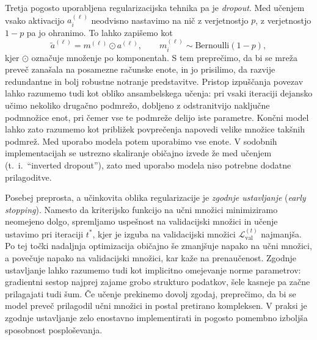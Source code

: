 Tretja pogosto uporabljena regularizacijska tehnika pa je \emph{dropout}.
%
%
Med učenjem vsako aktivacijo $a_i^{(\ell)}$ neodvisno nastavimo na nič z verjetnostjo $p$, z verjetnostjo $1-p$ pa jo ohranimo. To lahko zapišemo kot
\[
\tilde{a}^{(\ell)} = m^{(\ell)} \odot a^{(\ell)}, \qquad m_i^{(\ell)} \sim \text{Bernoulli}(1-p),
\]
kjer $\odot$ označuje množenje po komponentah. S tem preprečimo, da bi se mreža preveč zanašala na posamezne računske enote, in jo prisilimo, da razvije redundantne in bolj robustne notranje predstavitve. Pristop izpuščanja povezav lahko razumemo tudi kot obliko ansambelskega učenja:
%
%
pri vsaki iteraciji dejansko učimo nekoliko drugačno podmrežo, dobljeno z odstranitvijo naključne podmnožice enot, pri čemer vse te podmreže delijo iste parametre. Končni model lahko zato razumemo kot približek povprečenja napovedi velike množice takšnih podmrež. Med uporabo modela potem uporabimo vse enote. V sodobnih implementacijah se ustrezno skaliranje običajno izvede že med učenjem (t.\ i.\ ``inverted dropout''),
%
%
zato med uporabo modela niso potrebne dodatne prilagoditve.

Posebej preprosta, a učinkovita oblika regularizacije je \emph{zgodnje ustavljanje} ({\em early stopping}). Namesto da kriterijsko funkcijo na učni množici minimiziramo neomejeno dolgo, spremljamo uspešnost na validacijski množici in učenje ustavimo pri iteraciji $t^\ast$, kjer je izguba na validacijski množici $\mathcal{L}_{\text{val}}^{(t)}$ najmanjša. Po tej točki nadaljnja optimizacija običajno še zmanjšuje napako na učni množici, a povečuje napako na validacijski množici, kar kaže na prenaučenost. Zgodnje ustavljanje lahko razumemo tudi kot implicitno omejevanje norme parametrov: gradientni sestop najprej zajame grobo strukturo podatkov, šele kasneje pa začne prilagajati tudi šum. Če učenje prekinemo dovolj zgodaj, preprečimo, da bi se model preveč prilagodil učni množici in postal pretirano kompleksen. V praksi je zgodnje ustavljanje zelo enostavno implementirati in pogosto pomembno izboljša sposobnost posploševanja.

